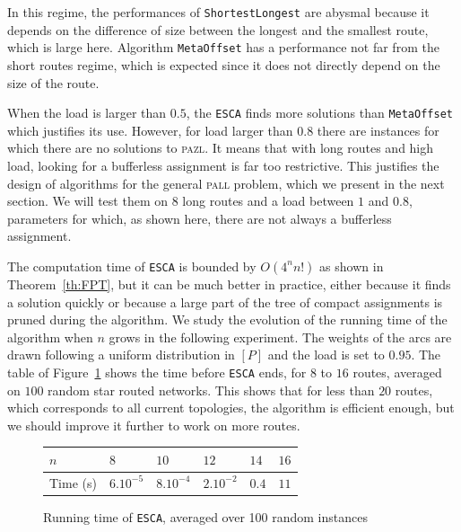 \documentclass[a4paper,10pt]{journal}
\newcommand\shortestlongest{\texttt{ShortestLongest}\xspace}
\newcommand\metaoffset{\texttt{MetaOffset}\xspace}
\newcommand\ESCA{\texttt{ESCA}\xspace}
\newcommand\pazl{\textsc{pazl}\xspace}
\newcommand\pall{\textsc{pall}\xspace}
\begin{document}
       In this regime, the performances of \shortestlongest are abysmal because it depends on the difference of size between the longest and the smallest route, which is large here.  Algorithm \metaoffset has a performance not far from the short routes regime, which is expected since it does not directly depend on the size of the route. 
      
       When the load is larger than $0.5$, the \ESCA finds more solutions than \metaoffset which justifies its use. However, for load larger than $0.8$ there are instances for which there are no solutions to \pazl. It means that with long routes and high load, looking for a bufferless assignment is far too restrictive. This justifies the design of algorithms for the general \pall problem, which we present in the next section. We will test them on $8$ long routes and a load between $1$ and $0.8$, parameters for which, as shown here, there are not always a bufferless assignment.
      
       The computation time of \ESCA is bounded by $O(4^nn!)$ as shown in Theorem~\ref{th:FPT}, but it can be much better in practice, either because it finds a solution quickly or because a large part of the tree of compact assignments is pruned during the algorithm. We study the evolution of the running time  of the algorithm when $n$ grows in the following experiment. The weights of the arcs are drawn following a uniform distribution in $[P]$ and the load is set to $0.95$.  The table of Figure~\ref{fig:table} shows the time before \ESCA ends, for $8$ to $16$ routes, averaged on $100$ random star routed networks. This shows that for less than $20$ routes, which corresponds to all current topologies, the algorithm is efficient enough, but we should improve it further to work on more routes.
       
             \begin{figure}[h]
         \begin{center}
         \begin{tabularx}{\textwidth}{|l|X|X|X|X|X|}
    \hline
   $n$ & $8$ & $10$& $12$&$14$& $16$\\
    \hline
   Time (s) & $6.10^{-5}$&$8.10^{-4}$&$2.10^{-2}$& $0.4$& $11$\\
    \hline
      \end{tabularx}
      \end{center}
      \caption{Running time of \ESCA, averaged over 100 random instances}
      \label{fig:table}
      \end{figure}
      
\end{document}
